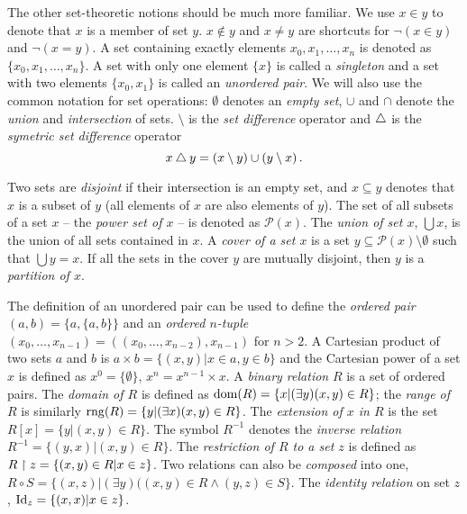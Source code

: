 
The other set-theoretic notions should be much more familiar. We use $x \in y$ to denote that $x$ is a member of set $y$. $x \notin y$ and $x \neq y$ are shortcuts for $\neg (x \in y)$ and $\neg (x = y)$. A set containing exactly elements $x_0, x_1, \dots, x_n$ is denoted as $\{x_0, x_1, \dots, x_n\}$. A set with only one element $\{x\}$ is called a \emph{singleton} and a set with two elements $\{x_0, x_1\}$ is called an \emph{unordered pair}. We will also use the common notation for set operations: $\emptyset$ denotes an \emph{empty set}, $\cup$ and $\cap$ denote the \emph{union} and \emph{intersection} of sets. $\setminus$ is the \emph{set difference} operator and $\bigtriangleup$ is the \emph{symetric set difference} operator $$x \bigtriangleup y = (x \setminus y) \cup (y \setminus x)\,.$$

Two sets are \emph{disjoint} if their intersection is an empty set, and $x \subseteq y$ denotes that $x$ is a subset of $y$ (all elements of $x$ are also elements of $y$). The set of all subsets of a set $x$ -- the \emph{power set of $x$} -- is denoted as $\mathcal{P}(x)$. The \emph{union of set $x$}, $\bigcup x$, is the union of all sets contained in $x$. A \emph{cover of a set $x$} is a set $y \subseteq \mathcal{P}(x) \setminus \emptyset$ such that $\bigcup y = x$. If all the sets in the cover $y$ are mutually disjoint, then $y$ is a \emph{partition of $x$}.

The definition of an unordered pair can be used to define the \emph{ordered pair} $(a, b) = \{a, \{a,b\}\}$ and an \emph{ordered $n$-tuple} $(x_0, \dots, x_{n-1}) = ((x_0, \dots, x_{n-2}), x_{n-1})$ for $n > 2$. A Cartesian product of two sets $a$ and $b$ is $a \times b = \{(x,y) | x \in a, y \in b\}$ and the Cartesian power of a set $x$ is defined as $x^0 = \{\emptyset\}$, $x^n = x^{n-1} \times x$. A \emph{binary relation} $R$ is a set of ordered pairs. The \emph{domain of $R$} is defined as $\operatorname{dom}(R) = \{x|(\exists y)(x,y)\in R\}$; the \emph{range of $R$} is similarly $\operatorname{rng}(R) = \{y|(\exists x)(x,y)\in R\}$. The \emph{extension of $x$ in $R$} is the set $R[x] = \{y|(x,y)\in R\}$. The symbol $R^{-1}$ denotes the \emph{inverse relation} $R^{-1}=\{(y,x)|(x,y)\in R\}$. The \emph{restriction of $R$ to a set $z$} is defined as $R \upharpoonright z = \{(x,y) \in R|x \in z\}$. Two relations can also be \emph{composed} into one, $R \circ S = \{(x,z)|(\exists y)((x,y) \in R \land (y,z) \in S\}$. The \emph{identity relation} on set $z$, $\mathrm{Id}_z = \{(x,x)|x\in z\}$. 

